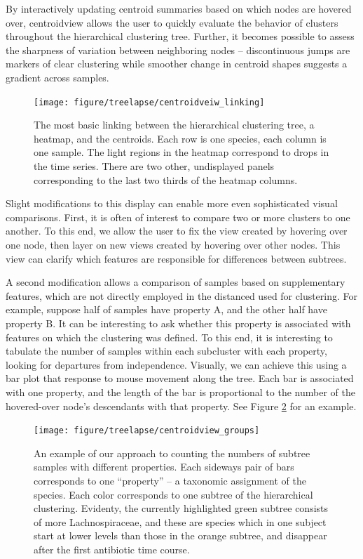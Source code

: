 By interactively updating centroid summaries based on which nodes are hovered
over, centroidview allows the user to quickly evaluate the behavior of clusters
throughout the hierarchical clustering tree. Further, it becomes possible to
assess the sharpness of variation between neighboring nodes -- discontinuous
jumps are markers of clear clustering while smoother change in centroid shapes
suggests a gradient across samples.

\begin{figure}
  \centering
  \texttt{[image: figure/treelapse/centroidveiw\_linking]}
  \caption{
    The most basic linking between the hierarchical clustering tree, a heatmap,
    and the centroids. Each row is one species, each column is one sample. The
    light regions in the heatmap correspond to drops in the time series. There
    are two other, undisplayed panels corresponding to the last two thirds of
    the heatmap columns.
    \label{fig:centroidview_linking}
  }
\end{figure}

Slight modifications to this display can enable more even sophisticated visual
comparisons. First, it is often of interest to compare two or more clusters to
one another. To this end, we allow the user to fix the view created by hovering
over one node, then layer on new views created by hovering over other nodes.
This view can clarify which features are responsible for differences between
subtrees.

A second modification allows a comparison of samples based on supplementary
features, which are not directly employed in the distanced used for clustering.
For example, suppose half of samples have property A, and the other half have
property B. It can be interesting to ask whether this property is associated
with features on which the clustering was defined. To this end, it is
interesting to tabulate the number of samples within each subcluster with each
property, looking for departures from independence. Visually, we can achieve
this using a bar plot that response to mouse movement along the tree. Each bar
is associated with one property, and the length of the bar is proportional to
the number of the hovered-over node's descendants with that property. See Figure
\ref{fig:centroidview_groups} for an example.

\begin{figure}
  \centering
  \texttt{[image: figure/treelapse/centroidview\_groups]}
  \caption{
    An example of our approach to counting the numbers of subtree samples with
    different properties. Each sideways pair of bars corresponds to one
    ``property'' -- a taxonomic assignment of the species. Each color
    corresponds to one subtree of the hierarchical clustering. Evidenty, the
    currently highlighted green subtree consists of more Lachnospiraceae, and
    these are species which in one subject start at lower levels than those in
    the orange subtree, and disappear after the first antibiotic time course.
    \label{fig:centroidview_groups}
  }
\end{figure}


